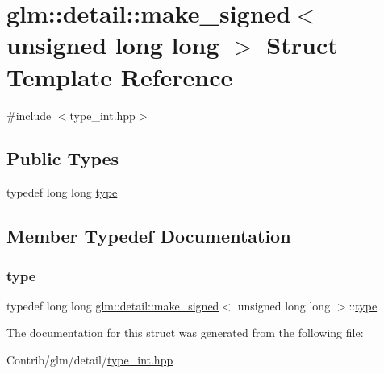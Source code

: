 \hypertarget{structglm_1_1detail_1_1make__signed_3_01unsigned_01long_01long_01_4}{}\section{glm\+:\+:detail\+:\+:make\+\_\+signed$<$ unsigned long long $>$ Struct Template Reference}
\label{structglm_1_1detail_1_1make__signed_3_01unsigned_01long_01long_01_4}


{\ttfamily \#include $<$type\+\_\+int.\+hpp$>$}

\subsection*{Public Types}
\begin{DoxyCompactItemize}
\item 
typedef long long \mbox{\hyperlink{structglm_1_1detail_1_1make__signed_3_01unsigned_01long_01long_01_4_a025f1f9880bc973147ffb0371771eb0b}{type}}
\end{DoxyCompactItemize}


\subsection{Member Typedef Documentation}
\mbox{\label{structglm_1_1detail_1_1make__signed_3_01unsigned_01long_01long_01_4_a025f1f9880bc973147ffb0371771eb0b}} 
\subsubsection{\texorpdfstring{type}{type}}
{\footnotesize\ttfamily typedef long long \mbox{\hyperlink{structglm_1_1detail_1_1make__signed}{glm\+::detail\+::make\+\_\+signed}}$<$ unsigned long long $>$\+::\mbox{\hyperlink{structglm_1_1detail_1_1make__signed_3_01unsigned_01long_01long_01_4_a025f1f9880bc973147ffb0371771eb0b}{type}}}



The documentation for this struct was generated from the following file\+:\begin{DoxyCompactItemize}
\item 
Contrib/glm/detail/\mbox{\hyperlink{type__int_8hpp}{type\+\_\+int.\+hpp}}\end{DoxyCompactItemize}
